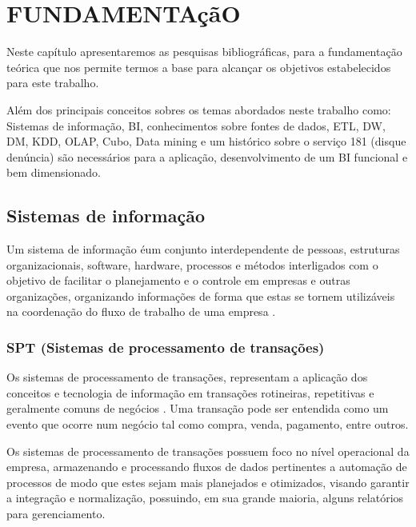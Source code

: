 %
%

\chapter{FUNDAMENTA\c{c}\~{a}O}\label{chap:fundamentacao}

Neste cap\'{i}tulo apresentaremos as pesquisas bibliogr\'{a}ficas, para a fundamenta\c{c}\~{a}o te\'{o}rica que nos permite termos a base para alcan\c{c}ar os objetivos estabelecidos para este trabalho.

Al\'{e}m dos principais conceitos sobres os temas abordados neste trabalho como: Sistemas de informa\c{c}\~{a}o, BI, conhecimentos sobre fontes de dados, ETL, DW, DM, KDD, OLAP, Cubo, Data mining e um hist\'{o}rico sobre o servi\c{c}o 181 (disque denúncia) s\~{a}o necess\'{a}rios para a aplica\c{c}\~{a}o, desenvolvimento de um BI funcional e bem dimensionado.

\section{Sistemas de informa\c{c}\~{a}o}

Um sistema de informa\c{c}\~{a}o \'{e}um conjunto interdependente de pessoas, estruturas organizacionais, software, hardware, processos e m\'{e}todos interligados com o objetivo de facilitar o planejamento e o controle em empresas e outras organiza\c{c}\~{o}es, organizando informa\c{c}\~{o}es de forma que estas se tornem utiliz\'{a}veis na coordena\c{c}\~{a}o do fluxo de trabalho de uma empresa \cite{si-laudon-laudon}.

\subsection{SPT (Sistemas de processamento de transa\c{c}\~{o}es)}

Os sistemas de processamento de transa\c{c}\~{o}es, representam a aplica\c{c}\~{a}o dos conceitos e tecnologia de informa\c{c}\~{a}o em transa\c{c}\~{o}es rotineiras, repetitivas e geralmente comuns de neg\'{o}cios \cite{si-stair-1998}. Uma transa\c{c}\~{a}o pode ser entendida como um evento que ocorre num neg\'{o}cio tal como compra, venda, pagamento, entre outros.

Os sistemas de processamento de transa\c{c}\~{o}es possuem foco no n\'{i}vel operacional da empresa, armazenando e processando fluxos de dados pertinentes a automa\c{c}\~{a}o de processos de modo que estes sejam mais planejados e otimizados, visando garantir a integra\c{c}\~{a}o e normaliza\c{c}\~{a}o, possuindo, em sua grande maioria, alguns relat\'{o}rios para gerenciamento.


